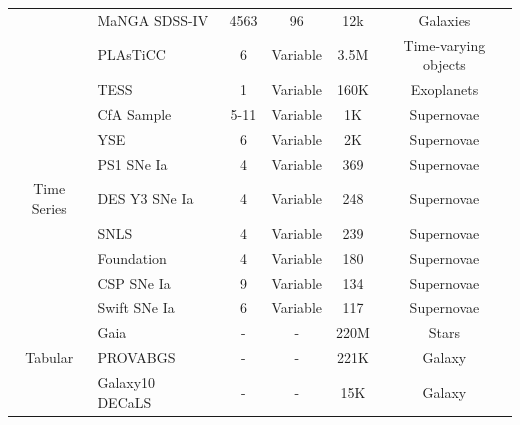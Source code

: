 \documentclass[dvipsnames,table]{article}
\begin{document}
\begin{table}[ht]
\begin{threeparttable}[b]
{\begin{tabular}{c l c c c c}
        \arrayrulecolor{black!30}\midrule
        \cellcolor{white}\multirow{-1}{*}{{\small Hyperspectral Image }} & MaNGA SDSS-IV~\citep{2022ApJS..259...35A} & 4563 & 96\texttimes96 & 12k & Galaxies \\
        \arrayrulecolor{black!30}\midrule
        \cellcolor{white} & PLAsTiCC\tnote{2} \citep{PLAsTiCC_2018}& 6 & Variable & 3.5M & Time-varying objects \\
        \cellcolor{white} & TESS \citep{ricker2015, Caldwell2020} & 1 & Variable & 160K & Exoplanets \\ 
        \cellcolor{white} & CfA Sample \citep{CfA3, CfA4, CfA-SECCSN, CfA-SNeII} & 5-11 & Variable & 1K & Supernovae \\
        \cellcolor{white} & YSE \citep{YSE_DR1_2023} & 6 &  Variable & 2K & Supernovae \\
        \cellcolor{white} & PS1 SNe Ia \citep{PS1} & 4&  Variable & 369 & Supernovae \\
        \cellcolor{white} {\small Time Series} & DES Y3 SNe Ia \cite{DESY3SN} & 4 &  Variable & 248 & Supernovae \\
        \cellcolor{white} & SNLS \citep{SNLS} & 4 & Variable & 239 & Supernovae \\ 
        \cellcolor{white} & Foundation \citep{foundation2018,foundation2019} & 4 & Variable & 180 & Supernovae \\
        \cellcolor{white} & CSP SNe Ia \citep{CSP-I_2010, CSP-I_2011, CSP-I_2017} & 9 & Variable & 134 & Supernovae \\
        \cellcolor{white} & Swift SNe Ia\citep{Sousa}& 6 & Variable & 117 & Supernovae \\
        \arrayrulecolor{black!30}\midrule
        \cellcolor{white} & Gaia~\citep{2023AA...674A...1G} & - & - & 220M & Stars \\
        \cellcolor{white} {\small Tabular} & PROVABGS~\cite{Hahn_2023}& - & - & 221K & Galaxy \\
        \cellcolor{white} & Galaxy10 DECaLS~\cite{2022MNRAS.509.3966W, leung_galaxy10_decals} & -  & - & 15K & Galaxy \\

\end{tabular}}
\end{threeparttable}
\end{table}
\end{document}
